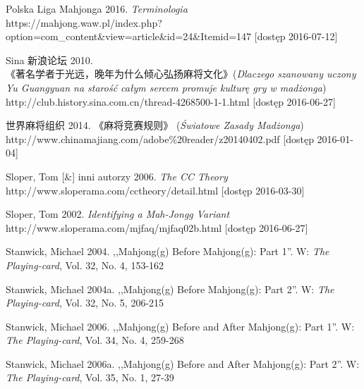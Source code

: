 Polska Liga Mahjonga 2016. \textit{Terminologia}
\\
https://mahjong.waw.pl/index.php?option=com\_content\&view=article\&id=24\&Itemid=147
[dostęp 2016-07-12]

Sina  新浪论坛 2010.  \\
《著名学者于光远，晚年为什么倾心弘扬麻将文化》(\textit{Dlaczego szanowany uczony Yu Guangyuan na
starość całym sercem promuje kulturę gry w madżonga})
\\http://club.history.sina.com.cn/thread-4268500-1-1.html [dostęp 2016-06-27]

 世界麻将组织 2014. 《麻将竞赛规则》 (\textit{Światowe Zasady Madżonga})
\\http://www.chinamajiang.com/adobe\%20reader/z20140402.pdf [dostęp 2016-01-04]

Sloper, Tom [\&] inni autorzy 2006. \textit{The CC Theory}
\\http://www.sloperama.com/cctheory/detail.html [dostęp
2016-03-30]

Sloper, Tom 2002. \textit{Identifying a Mah-Jongg Variant}
\\http://www.sloperama.com/mjfaq/mjfaq02b.html [dostęp
2016-06-27]

Stanwick, Michael 2004. ,,Mahjong(g) Before Mahjong(g): Part 1''. W:
\textit{The Playing-card}, Vol. 32, No. 4, 153-162

Stanwick, Michael 2004a. ,,Mahjong(g) Before Mahjong(g): Part 2''. W:
\textit{The Playing-card}, Vol. 32, No. 5, 206-215

Stanwick, Michael 2006. ,,Mahjong(g) Before and After Mahjong(g): Part 1''. W:
\textit{The Playing-card}, Vol. 34, No. 4, 259-268

Stanwick, Michael 2006a. ,,Mahjong(g) Before and After Mahjong(g): Part 2''. W:
\textit{The Playing-card}, Vol. 35, No. 1, 27-39


